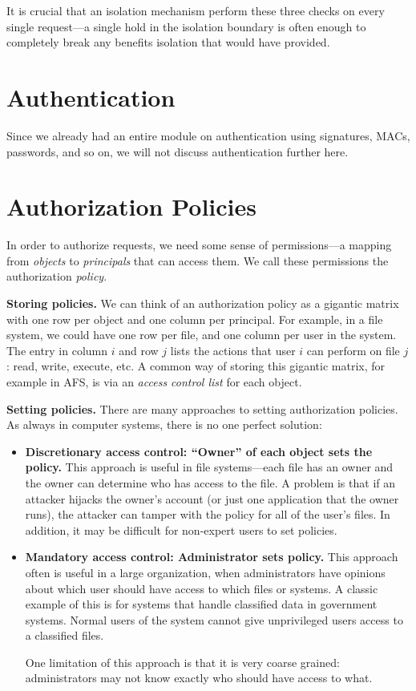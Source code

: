 \documentclass[
  letterpaper,
]{scrbook}
\theoremstyle{definition}
\theoremstyle{plain}
\theoremstyle{plain}
\theoremstyle{remark}
\begin{document}
It is crucial that an isolation mechanism perform these three checks on
every single request---a single hold in the isolation boundary is often
enough to completely break any benefits isolation that would have
provided.

\section{Authentication}\label{authentication-1}

Since we already had an entire module on authentication using
signatures, MACs, passwords, and so on, we will not discuss
authentication further here.

\section{Authorization Policies}\label{authorization-policies}

In order to authorize requests, we need some sense of permissions---a
mapping from \emph{objects} to \emph{principals} that can access them.
We call these permissions the authorization \emph{policy}.

\textbf{Storing policies.} We can think of an authorization policy as a
gigantic matrix with one row per object and one column per principal.
For example, in a file system, we could have one row per file, and one
column per user in the system. The entry in column \(i\) and row \(j\)
lists the actions that user \(i\) can perform on file \(j\): read,
write, execute, etc. A common way of storing this gigantic matrix, for
example in AFS, is via an \emph{access control list} for each object.

\textbf{Setting policies.} There are many approaches to setting
authorization policies. As always in computer systems, there is no one
perfect solution:

\begin{itemize}
\item
  \textbf{Discretionary access control: ``Owner'' of each object sets
  the policy.} This approach is useful in file systems---each file has
  an owner and the owner can determine who has access to the file. A
  problem is that if an attacker hijacks the owner's account (or just
  one application that the owner runs), the attacker can tamper with the
  policy for all of the user's files. In addition, it may be difficult
  for non-expert users to set policies.
\item
  \textbf{Mandatory access control: Administrator sets policy.} This
  approach often is useful in a large organization, when administrators
  have opinions about which user should have access to which files or
  systems. A classic example of this is for systems that handle
  classified data in government systems. Normal users of the system
  cannot give unprivileged users access to a classified files.

  One limitation of this approach is that it is very coarse grained:
  administrators may not know exactly who should have access to what.
\end{itemize}
\end{document}
